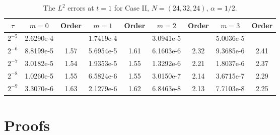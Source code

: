 \documentclass[10pt]{siamltex}
\begin{document}
\begin{table}[!h]
\caption{{The   $L^{2}$ errors at $t=1$ for Case II, $N=(24,32,24)$, $\alpha=1/2$.}}\label{tb1-2}
\centering\footnotesize
\begin{tabular}{|c|c|c|c|c|c|c|c|c|}
\hline
 $\tau$ & $m=0$ & Order& $m=1$ & Order& $m=2$ & Order & $m=3$ & Order\\
 \hline
$2^{-5}$&2.6290e-4&    &1.7419e-4&    &3.0941e-5&    &5.0036e-5&    \\
$2^{-6}$&8.8199e-5&1.57&5.6954e-5&1.61&6.1603e-6&2.32&9.3685e-6&2.41\\
$2^{-7}$&3.0182e-5&1.54&1.9353e-5&1.55&1.3292e-6&2.21&1.8037e-6&2.37\\
$2^{-8}$&1.0260e-5&1.55&6.5824e-6&1.55&3.0150e-7&2.14&3.6715e-7&2.29\\
$2^{-9}$&3.3070e-6&1.63&2.1279e-6&1.62&6.8463e-8&2.13&7.7103e-8&2.25\\
\hline
\end{tabular}
\end{table}







\section{Proofs}\label{sec:proof}

\end{document}
